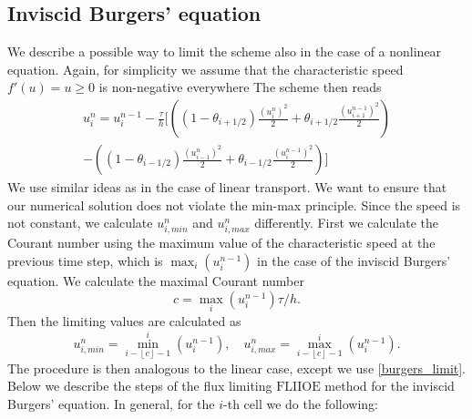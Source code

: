 \documentclass[../include.tex]{subfiles}
\begin{document}
\subsection{Inviscid Burgers' equation}
We describe a possible way to limit the scheme also in the case of a nonlinear equation. Again, for simplicity we assume that the characteristic speed $ f'(u) = u \geq 0 $ is non-negative everywhere The scheme then reads
\begin{multline}
	\label{burgers_limit}
	u_i^{n} = u_i^{n - 1} - \frac{\tau}{h}\biggl[\left((1 - \theta_{i+1/2})\frac{(u^n_{i})^2}{2} + \theta_{i+1/2}\frac{(u^{n-1}_{i+1})^2}{2} \right)\\	- \left((1 - \theta_{i-1/2})\frac{(u^n_{i-1})^2}{2} + \theta_{i-1/2}\frac{(u^{n-1}_{i})^2}{2}\right)\biggr]
\end{multline}
We use similar ideas as in the case of linear transport. We want to ensure that our numerical solution does not violate the min-max principle. Since the speed is not constant, we calculate $ u_{i,min}^n $ and $ u_{i,max}^n $ differently. First we calculate the Courant number using the maximum value of the characteristic speed at the previous time step, which is $ \max_i(u_i^{n-1}) $ in the case of the inviscid Burgers' equation. We calculate the maximal Courant number 
\begin{equation}
	\label{courant_burgers}
	 c=\max_i(u_i^{n-1}) \tau /h.
\end{equation}
Then the limiting values are calculated as
\[
u_{i,min}^n = \min_{i- \left \lfloor{c}\right \rfloor - 1}^{i}(u_i^{n-1}),\quad
u_{i,max}^n = \max_{i- \left \lfloor{c}\right \rfloor - 1}^{i}(u_i^{n-1}).
\]
The procedure is then analogous to the linear case, except we use \eqref{burgers_limit}. Below we describe the steps of the flux limiting $\mathrm{FLIIOE} $ method for the inviscid Burgers' equation. In general, for the $ i $-th cell we do the following:
\end{document}
